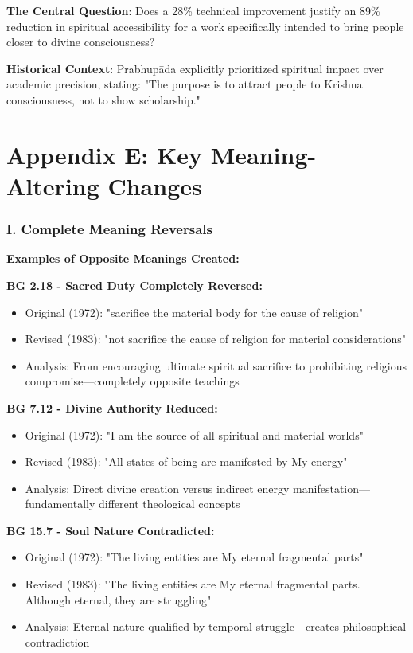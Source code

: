 \documentclass[11pt,twoside]{book}
\begin{document}
\textbf{\textbf{The Central Question}}: Does a 28\% technical improvement justify an 89\% reduction in spiritual accessibility for a work specifically intended to bring people closer to divine consciousness?

\textbf{\textbf{Historical Context}}: Prabhupāda explicitly prioritized spiritual impact over academic precision, stating: "The purpose is to attract people to Krishna consciousness, not to show scholarship."
\part*{Appendix E: Key Meaning-Altering Changes}
\label{sec:org3c032e4}
\thispagestyle{plain}
\section*{I. Complete Meaning Reversals}
\label{sec:orgf6abe79}

\textbf{\textbf{Examples of Opposite Meanings Created:}}

\textbf{\textbf{BG 2.18 - Sacred Duty Completely Reversed:}}
\begin{itemize}
\item Original (1972): "sacrifice the material body for the cause of religion"
\item Revised (1983): "not sacrifice the cause of religion for material considerations"
\item Analysis: From encouraging ultimate spiritual sacrifice to prohibiting religious 
compromise—completely opposite teachings
\end{itemize}

\textbf{\textbf{BG 7.12 - Divine Authority Reduced:}}
\begin{itemize}
\item Original (1972): "I am the source of all spiritual and material worlds"
\item Revised (1983): "All states of being are manifested by My energy"
\item Analysis: Direct divine creation versus indirect energy 
manifestation—fundamentally different theological concepts
\end{itemize}

\textbf{\textbf{BG 15.7 - Soul Nature Contradicted:}}
\begin{itemize}
\item Original (1972): "The living entities are My eternal fragmental parts"
\item Revised (1983): "The living entities are My eternal fragmental parts. Although eternal, they are struggling"
\item Analysis: Eternal nature qualified by temporal struggle—creates philosophical 
contradiction
\end{itemize}
\end{document}
